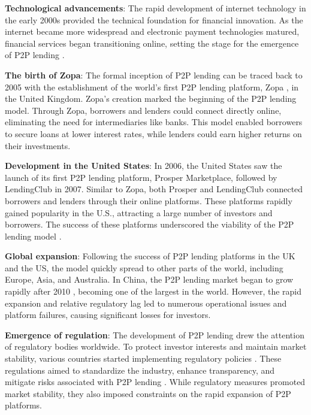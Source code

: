 \documentclass{article}
\begin{document}
\textbf{Technological advancements}: The rapid development of internet technology in the early 2000s provided the technical foundation for financial innovation. As the internet became more widespread and electronic payment technologies matured, financial services began transitioning online, setting the stage for the emergence of P2P lending \citep{freedman_information_2017}.

\textbf{The birth of Zopa}: The formal inception of P2P lending can be traced back to 2005 with the establishment of the world’s first P2P lending platform, Zopa \citep{freedman_information_2017}, in the United Kingdom. Zopa's creation marked the beginning of the P2P lending model. Through Zopa, borrowers and lenders could connect directly online, eliminating the need for intermediaries like banks. This model enabled borrowers to secure loans at lower interest rates, while lenders could earn higher returns on their investments.

\textbf{Development in the United States}: In 2006, the United States saw the launch of its first P2P lending platform, Prosper Marketplace, followed by LendingClub in 2007. Similar to Zopa, both Prosper and LendingClub connected borrowers and lenders through their online platforms. These platforms rapidly gained popularity in the U.S., attracting a large number of investors and borrowers. The success of these platforms underscored the viability of the P2P lending model \citep{morse_peer--peer_2015}.

\textbf{Global expansion}: Following the success of P2P lending platforms in the UK and the US, the model quickly spread to other parts of the world, including Europe, Asia, and Australia. In China, the P2P lending market began to grow rapidly after 2010 \citep{huang_online_2018}, becoming one of the largest in the world. However, the rapid expansion and relative regulatory lag led to numerous operational issues and platform failures, causing significant losses for investors.

\textbf{Emergence of regulation}: The development of P2P lending drew the attention of regulatory bodies worldwide. To protect investor interests and maintain market stability, various countries started implementing regulatory policies \citep{nemoto_optimal_2019,fca_ps1914_2018, economic_daily_p2p12___2015}. These regulations aimed to standardize the industry, enhance transparency, and mitigate risks associated with P2P lending . While regulatory measures promoted market stability, they also imposed constraints on the rapid expansion of P2P platforms.
\end{document}
